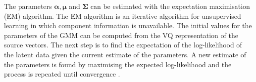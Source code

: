 The parameters $\boldsymbol{\alpha}, \boldsymbol{\mu}$ and $ \mathbf{\Sigma}$ can be estimated with the expectation maximisation (EM) algorithm. The EM algorithm is an iterative algorithm for unsupervised learning in which component information is unavailable. The initial values for the parameters of the GMM can be computed from the VQ representation of the source vectors. The next step is to find the expectation of the log-likelihood of the latent data given the current estimate of the parameters. A new estimate of the parameters is found by maximising the expected log-likelihood and the process is repeated until convergence \cite{taletek}.


% 
% 
% 


